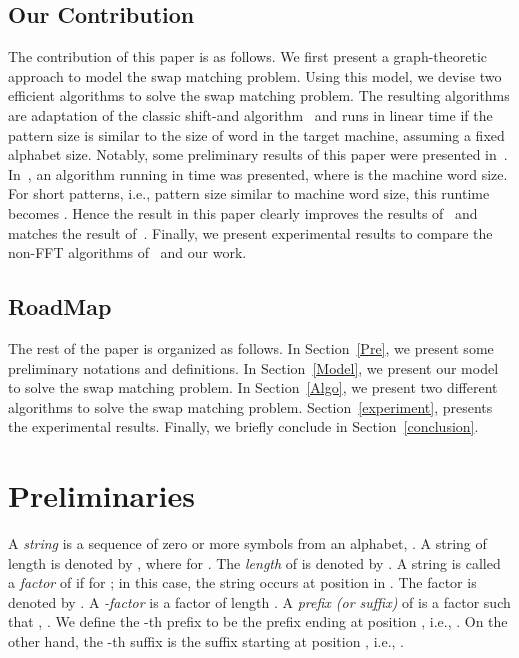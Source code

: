 \documentclass{llncs}
\begin{document}
\subsection{Our Contribution}
The contribution of this paper is as follows. We first present a graph-theoretic approach to model the swap matching problem. Using this model, we devise two efficient algorithms to solve the swap matching problem. The resulting algorithms are adaptation of the classic shift-and algorithm~\cite{CharrasL04} and runs in linear time if the pattern size is similar to the size of word in the target machine, assuming a fixed alphabet size. Notably, some preliminary results of this paper were presented in~\cite{IR}. In~\cite{IR}, an algorithm running in  time was presented, where  is the machine word size. For short patterns, i.e., pattern size similar to machine word size, this runtime becomes . Hence the result in this paper clearly improves the results of~\cite{IR} and matches the result of~\cite{CS}. Finally, we present experimental results to compare the non-FFT algorithms of~\cite{CS,CCS} and our work.  



\subsection{RoadMap}
The rest of the paper is organized as follows. In Section~\ref{Pre}, we present some preliminary notations and definitions. In Section~\ref{Model}, we present our model to solve the swap matching problem. In Section~\ref{Algo}, we present two different algorithms to solve the swap matching problem. Section~\ref{experiment}, presents the experimental results. Finally, we briefly conclude in Section~\ref{conclusion}.



\section{\label{Pre}Preliminaries}
A \emph{string} is a sequence of zero or more symbols from an alphabet, . A string  of length  is denoted by , where  for . The \emph{length} of  is denoted by . A string  is called a \emph{factor} of  if  for ; in this case, the string  occurs at position  in . The factor  is denoted by . A \emph{-factor} is a factor of length . A \emph{prefix (or suffix)} of  is a factor  such that , . We define the -th prefix to be the prefix ending at position , i.e., . On the other hand, the -th suffix is the suffix starting at position , i.e., .
\end{document}
